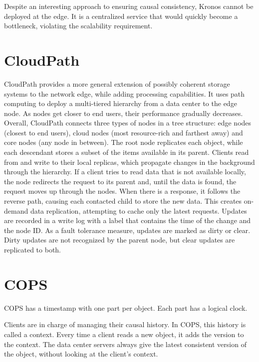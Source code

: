 Despite an interesting approach to ensuring causal consistency, 
Kronos cannot be deployed at the edge. It is a centralized service 
that would quickly become a bottleneck, violating the scalability requirement.

\section{CloudPath}
\label{sec:soa:cloudpath}

CloudPath \cite{mortazavi2017cloudpath} provides a more 
general extension of possibly coherent storage systems to the network edge, 
while adding processing capabilities. It uses path computing to deploy a 
multi-tiered hierarchy from a data center to the edge node. 
As nodes get closer to end users, their performance gradually decreases. 
Overall, CloudPath connects three types of nodes in a tree structure: 
edge nodes (closest to end users), 
cloud nodes (most resource-rich and farthest away) and 
core nodes (any node in between). 
The root node replicates each object, 
while each descendant stores a subset of the items available in its parent. 
Clients read from and write to their local replicas, which propagate changes 
in the background through the hierarchy. If a client tries to read data that 
is not available locally, the node redirects the request to its parent and, 
until the data is found, the request moves up through the nodes. 
When there is a response, it follows the reverse path, causing each contacted 
child to store the new data. This creates on-demand data replication, 
attempting to cache only the latest requests. Updates are recorded in a write 
log with a label that contains the time of the change and the node ID. 
As a fault tolerance measure, updates are marked as dirty or clear. 
Dirty updates are not recognized by the parent node, but clear updates are 
replicated to both.

\section{COPS}
\label{sec:soa:cops}

COPS \cite{lloyd2011don} has a timestamp with one part per object. 
Each part has a logical clock. 

Clients are in charge of managing their causal history. 
In COPS, this history is called a context. 
Every time a client reads a new object, it adds the version to the context. 
The data center servers always give the latest consistent version of the object,
without looking at the client's context. 

